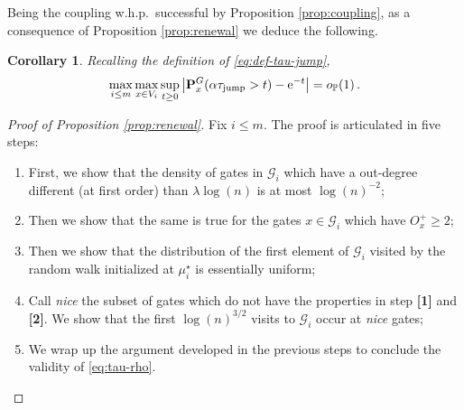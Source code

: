 \documentclass[11pt,oneside]{amsart}
\numberwithin{equation}{section}  %
\theoremstyle{plain}
\newtheorem{corollary}[theorem]{Corollary}
\newcommand{\whp}{{w.h.p.~}}
\newcommand{\p}{\mathbb{P}}
\newcommand{\op}{o_{\p}}
\newcommand{\gates}{\mathcal{G}}
\newcommand{\tauj}{\tau_{\textup{jump}}}
\newcommand{\muqs}{\mu^\star_i}
\begin{document}
Being the coupling \whp successful by Proposition \ref{prop:coupling}, as a consequence of Proposition \ref{prop:renewal} we deduce the following.
\begin{corollary}\label{coro:renewal}
	Recalling the definition of \eqref{eq:def-tau-jump}, 
	\begin{equation}\label{eq:tau-rho-2}
		\max_{i \le m}\max_{x\in V_i}\sup_{t \ge 0}\left|\mathbf{P}^G_x(\alpha \tauj> t)-{\rm e}^{-t}\right|=\op(1)\,.
	\end{equation}
\end{corollary}
\begin{proof}[Proof of Proposition \ref{prop:renewal}]
	Fix $i \le m$. The proof is articulated in five steps:
	\begin{enumerate}
		\item[{\bf [1]}] First, we show that the density of gates in $\gates_i$ which have a out-degree different (at first order) than $\lambda\log(n)$ is at most $\log(n)^{-2}$;
		\item[{\bf [2]}] Then we show that the same is true for the gates $x \in \gates_i$ which have $O^+_x\ge 2$;
		\item[{\bf [3]}] Then we show that the distribution of the first element of $\gates_i$ visited by the random walk initialized at $\muqs$ is essentially uniform;
		\item[{\bf [4]}] Call \emph{nice} the subset of gates which do not have the properties in step {\bf [1]} and {\bf [2]}. We show that the first $\log(n)^{3/2}$ visits to $\gates_i$ occur at \emph{nice} gates;
		\item[{\bf [5]}] We wrap up the argument developed in the previous steps to conclude the validity of \eqref{eq:tau-rho}.\\
	\end{enumerate}
    

\end{proof}
\end{document}
